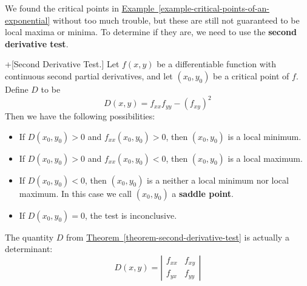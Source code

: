 \documentclass[10pt,]{book}
\newcommand{\terminology}[1]{\textbf{#1}}
\theoremstyle{ptxplainnotitle}
\theoremstyle{ptxplaintitle}
\theoremstyle{ptxplainnotitle}
\theoremstyle{ptxplaintitle}
\theoremstyle{ptxplainnotitle}
\theoremstyle{ptxplaintitle}
\theoremstyle{ptxdefinitionnotitle}
\theoremstyle{ptxdefinitiontitle}
\theoremstyle{ptxdefinitionnotitle}
\theoremstyle{ptxdefinitiontitle}
\theoremstyle{ptxdefinitionnotitle}
\theoremstyle{ptxdefinitiontitle}
\theoremstyle{ptxdefinitionnotitle}
\theoremstyle{ptxdefinitiontitle}
\theoremstyle{ptxdefinitionnotitle}
\theoremstyle{ptxdefinitiontitle}
\numberwithin{equation}{section}
\begin{document}
\hypertarget{p-1080}{}%
We found the critical points in \hyperref[example-critical-points-of-an-exponential]{Example~\ref{example-critical-points-of-an-exponential}} without too much trouble, but these are still not guaranteed to be local maxima or minima. To determine if they are, we need to use the \terminology{second derivative test}.%
\begin{theorem}+[{Second Derivative Test.}]\label{theorem-second-derivative-test}
\hypertarget{p-1081}{}%
Let \(f(x,y)\) be a differentiable function with continuous second partial derivatives, and let \((x_{0},y_{0})\) be a critical point of \(f\). Define \(D\) to be%
\begin{equation*}
D(x,y) = f_{xx}f_{yy} - (f_{xy})^{2}
\end{equation*}
Then we have the following possibilities: \leavevmode%
\begin{itemize}[label=\textbullet]
\item{}If \(D(x_{0},y_{0}) > 0 \) and \(f_{xx}(x_{0},y_{0}) > 0\), then \((x_{0},y_{0})\) is a local minimum.%
\item{}If \(D(x_{0},y_{0}) > 0 \) and \(f_{xx}(x_{0},y_{0}) < 0\), then \((x_{0},y_{0})\) is a local maximum.%
\item{}If \(D(x_{0},y_{0}) < 0 \), then \((x_{0},y_{0})\) is a neither a local minimum nor local maximum. In this case we call \((x_{0},y_{0})\) a \terminology{saddle point}.%
\item{}If \(D(x_{0},y_{0}) = 0 \), the test is inconclusive.%
\end{itemize}
%
\end{theorem}
\hypertarget{p-1082}{}%
The quantity \(D\) from \hyperref[theorem-second-derivative-test]{Theorem~\ref{theorem-second-derivative-test}} is actually a determinant:%
\begin{equation*}
D(x,y) = \left|\begin{array}{cc} f_{xx} & f_{xy} \\ f_{yx} & f_{yy}\end{array}\right|
\end{equation*}
%
\end{document}
